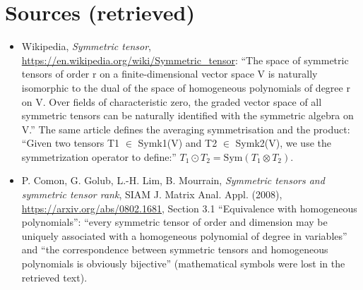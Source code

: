 \documentclass[11pt]{article}
\theoremstyle{definition}
\begin{document}
\section{Sources (retrieved)}
\begin{itemize}
\item Wikipedia, \emph{Symmetric tensor}, \url{https://en.wikipedia.org/wiki/Symmetric_tensor}:
``The space of symmetric tensors of order r on a finite-dimensional vector space V is naturally
isomorphic to the dual of the space of homogeneous polynomials of degree r on V.  Over fields of
characteristic zero, the graded vector space of all symmetric tensors can be naturally identified
with the symmetric algebra on V.'' The same article defines the averaging symmetrisation and the
product: ``Given two tensors T1 $\in$ Symk1(V) and T2 $\in$ Symk2(V), we use the symmetrization
operator to define:'' $T_1\odot T_2=\mathrm{Sym}(T_1\otimes T_2)$.
\item P. Comon, G. Golub, L.-H. Lim, B. Mourrain, \emph{Symmetric tensors and symmetric tensor
rank}, SIAM J. Matrix Anal. Appl. (2008), \url{https://arxiv.org/abs/0802.1681}, Section 3.1
``Equivalence with homogeneous polynomials'': ``every symmetric tensor of order and dimension may
be uniquely associated with a homogeneous polynomial of degree in variables'' and ``the
correspondence between symmetric tensors and homogeneous polynomials is obviously bijective''
(mathematical symbols were lost in the retrieved text).
\end{itemize}
\end{document}
